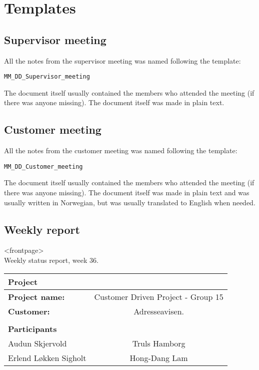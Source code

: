 \chapter{Templates}\label{appendixTemplate}
\section{Supervisor meeting}\label{namingTemplate}
All the notes from the supervisor meeting was named following the template: 
\begin{verbatim}
MM_DD_Supervisor_meeting
\end{verbatim}
The document itself usually contained the members who attended the meeting (if there was anyone missing).
The document itself was made in plain text.
\newpage
\section{Customer meeting}
All the notes from the customer meeting was named following the template: 
\begin{verbatim}
MM_DD_Customer_meeting
\end{verbatim}
The document itself usually contained the members who attended the meeting (if there was anyone missing).
The document itself was made in plain text and was usually written in Norwegian, but was usually translated to English when needed.

\section{Weekly report}\label{weeklyReport}

\begin{center}
<frontpage>\\
Weekly status report, week 36.
  \begin{tabular}{| l  c |}
    \hline
    Project & \\ \hline
    \textbf{Project name:} & Customer Driven Project - Group 15 \\
    \textbf{Customer:} & Adresseavisen. \\ \hline
     & \\
     \textbf{Participants} & \\ \hline
     Audun Skjervold & Truls Hamborg \\
     Erlend Løkken Sigholt & Hong-Dang Lam \\
    \hline
  \end{tabular}
  \end{center}




